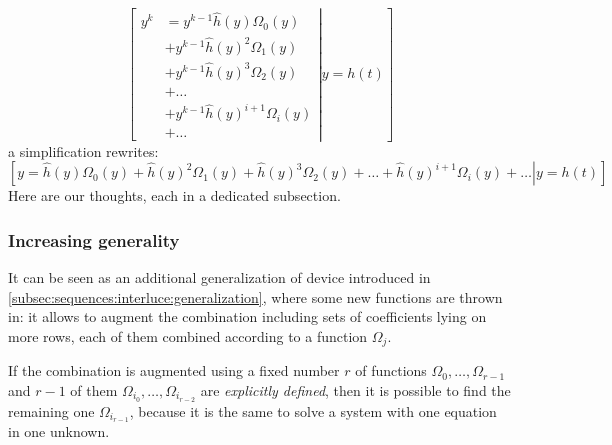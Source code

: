 \begin{displaymath}
    \left.\left[
            \begin{split}
                y^{k} &= y^{k-1}\hat{h}(y) \Omega_{0}(y) \\
                &+ y^{k-1}\hat{h}(y)^{2} \Omega_{1}(y) \\
                &+ y^{k-1}\hat{h}(y)^{3} \Omega_{2}(y) \\
                &+ \ldots\\ 
                &+ y^{k-1}\hat{h}(y)^{i+1} \Omega_{i}(y)\\
                &+ \ldots
            \end{split}
        \right| y = h(t) \right]
\end{displaymath}
a simplification rewrites:
\begin{displaymath}
    \left.\left[
        y = \hat{h}(y) \Omega_{0}(y) + 
        \hat{h}(y)^{2} \Omega_{1}(y) + \hat{h}(y)^{3} \Omega_{2}(y) +
        \ldots +
        \hat{h}(y)^{i+1} \Omega_{i}(y) + \ldots
        \right| y = h(t) \right]
\end{displaymath}
Here are our thoughts, each in a dedicated subsection.

\subsubsection{Increasing generality}
It can be seen as an additional generalization of device introduced in
\autoref{subsec:sequences:interluce:generalization},
where some new functions are thrown in: it allows to augment the
combination including sets of coefficients lying on more rows, 
each of them combined according to a function $\Omega_{j}$. 

If the combination is augmented using a fixed number $r$ 
of functions $\Omega_{0},\ldots,\Omega_{r-1}$
and $r-1$ of them $\Omega_{i_{0}},\ldots,\Omega_{i_{r-2}}$
are \emph{explicitly defined}, then it is possible to find 
the remaining one $\Omega_{i_{r-1}}$, because it is the same to solve a system
with one equation in one unknown.


